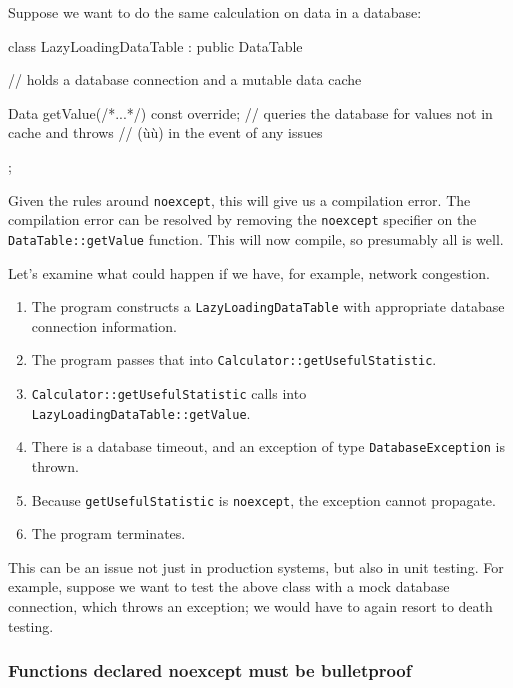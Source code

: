 \noindent Suppose we want to do the same calculation on data in a database:

\begin{emcppslisting}[emcppsbatch=e31,emcppserrorlines={5}]
class LazyLoadingDataTable : public DataTable
{
    // holds a database connection and a mutable data cache

    Data getValue(/*...*/) const override;
        // queries the database for values not in cache and throws
        // (ù{}ù) in the event of any issues
};
\end{emcppslisting}
    

\noindent Given the rules around \lstinline!noexcept!, this will give us a
compilation error. The compilation error can be resolved by removing the
\lstinline!noexcept! specifier on the \lstinline!DataTable::getValue!
function. This will now compile, so presumably all is well.

Let's examine what could happen if we have, for example, network
congestion.
\begin{enumerate}
\item{The program constructs a \lstinline!LazyLoadingDataTable! with appropriate database connection information.}
\item{The program passes that into \lstinline!Calculator::getUsefulStatistic!.}
\item{\lstinline!Calculator::getUsefulStatistic! calls into \lstinline!LazyLoadingDataTable::getValue!.}
\item{There is a database timeout, and an exception of type \lstinline!DatabaseException! is thrown.}
\item{Because \lstinline!getUsefulStatistic! is \lstinline!noexcept!, the exception cannot propagate.}
\item{The program terminates.}
\end{enumerate}
This can be an issue not just in production systems, but also in unit
testing. For example, suppose we want to test the above class with a
mock database connection, which throws an exception; we would have to
again resort to death testing.

\subsubsection[Functions declared \lstinline!noexcept! must be bulletproof]{Functions declared {\SubsubsecCode noexcept} must be bulletproof}\label{functions-declared-noexcept-must-be-bulletproof}

